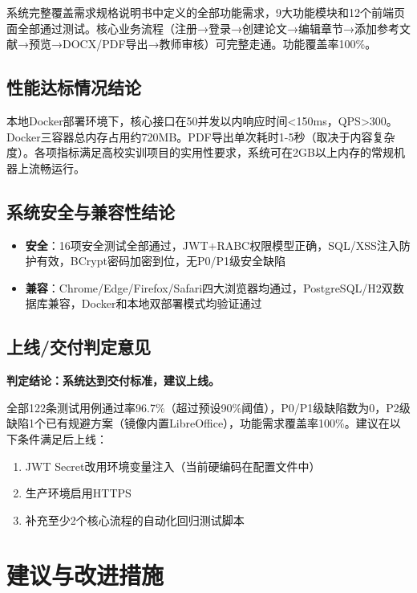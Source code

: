 系统完整覆盖需求规格说明书中定义的全部功能需求，9大功能模块和12个前端页面全部通过测试。核心业务流程（注册→登录→创建论文→编辑章节→添加参考文献→预览→DOCX/PDF导出→教师审核）可完整走通。功能覆盖率100\%。

\subsection{性能达标情况结论}

本地Docker部署环境下，核心接口在50并发以内响应时间<150ms，QPS>300。Docker三容器总内存占用约720MB。PDF导出单次耗时1-5秒（取决于内容复杂度）。各项指标满足高校实训项目的实用性要求，系统可在2GB以上内存的常规机器上流畅运行。

\subsection{系统安全与兼容性结论}

\begin{itemize}
    \item \textbf{安全}：16项安全测试全部通过，JWT+RABC权限模型正确，SQL/XSS注入防护有效，BCrypt密码加密到位，无P0/P1级安全缺陷
    \item \textbf{兼容}：Chrome/Edge/Firefox/Safari四大浏览器均通过，PostgreSQL/H2双数据库兼容，Docker和本地双部署模式均验证通过
\end{itemize}

\subsection{上线/交付判定意见}

\textbf{判定结论：系统达到交付标准，建议上线。}

全部122条测试用例通过率96.7\%（超过预设90\%阈值），P0/P1级缺陷数为0，P2级缺陷1个已有规避方案（镜像内置LibreOffice），功能需求覆盖率100\%。建议在以下条件满足后上线：
\begin{enumerate}
    \item JWT Secret改用环境变量注入（当前硬编码在配置文件中）
    \item 生产环境启用HTTPS
    \item 补充至少2个核心流程的自动化回归测试脚本
\end{enumerate}

\section{建议与改进措施}

